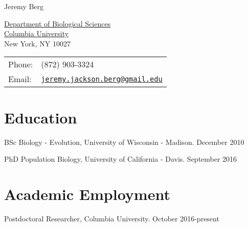 \documentclass[letterpaper]{article}
\def\name{Jeremy Berg}
\renewenvironment{itemize}{
  \begin{list}{}{
    \setlength{\leftmargin}{1.5em}
  }
}{
  \end{list}
}
\begin{document}
{\huge \name}


\vspace{0.25in}

\begin{minipage}{0.45\linewidth}
  \href{http://biology.columbia.edu/}{Department of Biological Sciences} \\
  \href{http://www.columbia.edu/}{Columbia University} \\
  New York, NY 10027
\end{minipage}
\begin{minipage}{0.45\linewidth}
  \begin{tabular}{ll}
    Phone: & (872) 903-3324 \\
    Email: & \href{jeremy.jackson.berg@gmail.edu}{\tt jeremy.jackson.berg@gmail.edu} \\
  \end{tabular}
\end{minipage}

\section*{Education}
\begin{itemize}
 \item BSc Biology - Evolution, University of Wisconsin - Madison.  December 2010
 \item PhD Population Biology, University of California - Davis.  September 2016
 \end{itemize}

\section*{Academic Employment}
\begin{itemize}
%
\item Postdoctoral Researcher, Columbia University. October 2016-present
%
\end{itemize}
\end{document}
